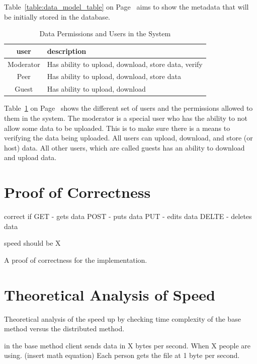 \documentclass[acmsmall]{acmart}
\begin{document}
Table~\ref{table:data_model_table} on Page~\pageref{table:data_model_table} aims to show the metadata that will be initially stored in the database.


\begin{table}[h]
\caption{Data Permissions and Users in the System}
\label{table:data_perm_table}
\begin{tabular}{cl}
    \toprule
    user & description \\
    \midrule
   Moderator & Has ability to upload, download, store data, verify \\
    Peer & Has ability to upload, download, store data \\
    Guest & Has ability to upload, download \\
   \bottomrule 
\end{tabular}
\end{table}

Table~\ref{table:data_perm_table} on Page~\pageref{table:data_perm_table} shows the different set of users and the permissions allowed to them in the system. The moderator is a special user who has the ability to not allow some data to be uploaded. This is to make sure there is a means to verifying the data being uploaded. All users can upload, download, and store (or host) data. All other users, which are called guests has an ability to download and upload data.



\section{Proof of Correctness}
correct if
GET - gets data
POST - puts data
PUT - edits data
DELTE - deletes data

speed should be X

A proof of correctness for the implementation.

\section{Theoretical Analysis of Speed}

Theoretical analysis of the speed up by checking time complexity of the base method versus the distributed method.

in the base method
client sends data in X bytes per second. When X people are using. 
(insert math equation)
Each person gets the file at 1 byte per second.
\end{document}
